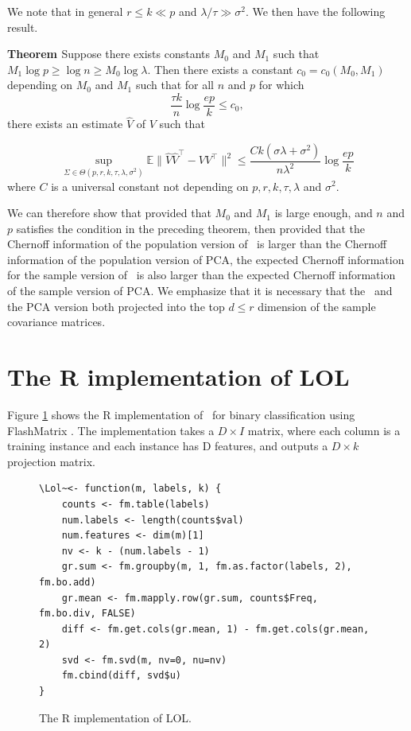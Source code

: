 \documentclass[10pt]{article}
\begin{document}
We note that in general $r \leq k \ll p$ and $\lambda/\tau \gg \sigma^2$. We then have the following result.

{\bf Theorem \cite{cai-pca-1}}
Suppose there exists constants $M_0$ and $M_1$ such that $M_1 \log p \geq \log n \geq M_0 \log \lambda$. Then there exists a constant $c_0 = c_0(M_0, M_1)$ depending on $M_0$ and $M_1$ such that for all $n$ and $p$ for which
$$ \frac{\tau k}{n} \log \frac{e p}{k} \leq c_0, $$ there exists an estimate $\hat{V}$ of $V$ such that

$$ \sup_{\Sigma \in \Theta(p,r,k,\tau,\lambda,\sigma^2)} \mathbb{E} \|\hat{V} \hat{V}^{\top} - V V^{\top} \|^{2} \leq \frac{C k (\sigma \lambda + \sigma^2)}{n \lambda^{2}} \log \frac{e p}{k}$$
where $C$ is a universal constant not depending on $p,r,k,\tau,\lambda$ and $\sigma^2$.

We can therefore show that provided that $M_0$ and $M_1$ is large enough, and $n$ and $p$ satisfies the condition in the preceding theorem, then provided that the Chernoff information of the population version of \Lol~is larger than the Chernoff information of the population version of PCA, the expected Chernoff information for the sample version of \Lol~is also larger than the expected Chernoff information of the sample version of PCA. We emphasize that it is necessary that the \Lol~and the PCA version both projected into the top $d \leq r$ dimension of the sample covariance matrices.





\clearpage
\section{The R implementation of LOL}

Figure \ref{Rimpl} shows the R implementation of \Lol~for binary classification
using FlashMatrix \cite{FlashMatrix}. The implementation takes a $D \times I$
matrix, where each column is a training instance and each instance has D
features, and outputs a $D \times k$ projection matrix.

\clearpage
\begin{figure}[t]
\begin{lstlisting}
\Lol~<- function(m, labels, k) {
	counts <- fm.table(labels)
	num.labels <- length(counts$val)
	num.features <- dim(m)[1]
	nv <- k - (num.labels - 1)
	gr.sum <- fm.groupby(m, 1, fm.as.factor(labels, 2), fm.bo.add)
	gr.mean <- fm.mapply.row(gr.sum, counts$Freq, fm.bo.div, FALSE)
	diff <- fm.get.cols(gr.mean, 1) - fm.get.cols(gr.mean, 2)
	svd <- fm.svd(m, nv=0, nu=nv)
	fm.cbind(diff, svd$u)
}
\end{lstlisting}
\caption{The R implementation of LOL.}
\label{Rimpl}
\end{figure}






\clearpage
% 


\end{document}
